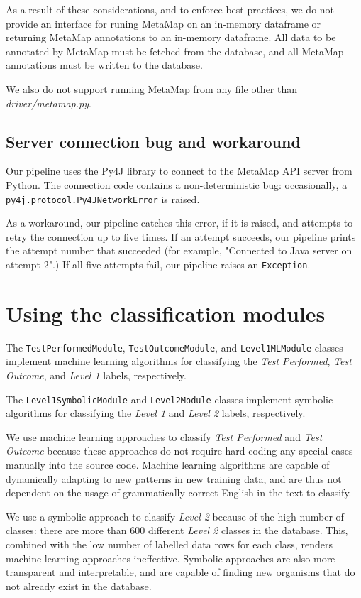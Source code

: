 \documentclass[a4paper]{article}
\begin{document}
As a result of these considerations, and to enforce best practices, we do not provide an interface for runing MetaMap on an in-memory dataframe or returning MetaMap annotations to an in-memory dataframe. All data to be annotated by MetaMap must be fetched from the database, and all MetaMap annotations must be written to the database.

We also do not support running MetaMap from any file other than \textit{driver/metamap.py}.

\subsection{Server connection bug and workaround}

Our pipeline uses the Py4J library to connect to the MetaMap API server from Python. The connection code contains a non-deterministic bug: occasionally, a \lstinline{py4j.protocol.Py4JNetworkError} is raised.

As a workaround, our pipeline catches this error, if it is raised, and attempts to retry the connection up to five times. If an attempt succeeds, our pipeline prints the attempt number that succeeded (for example, "Connected to Java server on attempt 2".) If all five attempts fail, our pipeline raises an \lstinline{Exception}.

\section{Using the classification modules}

The \lstinline{TestPerformedModule}, \lstinline{TestOutcomeModule}, and \lstinline{Level1MLModule} classes implement machine learning algorithms for classifying the \textit{Test Performed}, \textit{Test Outcome}, and \textit{Level 1} labels, respectively.

The \lstinline{Level1SymbolicModule} and \lstinline{Level2Module} classes implement symbolic algorithms for classifying the \textit{Level 1} and \textit{Level 2} labels, respectively.

We use machine learning approaches to classify \textit{Test Performed} and \textit{Test Outcome} because these approaches do not require hard-coding any special cases manually into the source code. Machine learning algorithms are capable of dynamically adapting to new patterns in new training data, and are thus not dependent on the usage of grammatically correct English in the text to classify.

We use a symbolic approach to classify \textit{Level 2} because of the high number of classes: there are more than 600 different \textit{Level 2} classes in the database. This, combined with the low number of labelled data rows for each class, renders machine learning approaches ineffective. Symbolic approaches are also more transparent and interpretable, and are capable of finding new organisms that do not already exist in the database.
\end{document}

